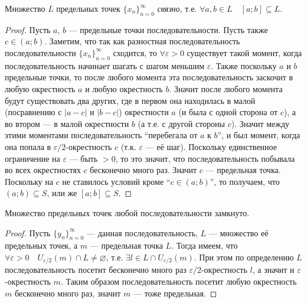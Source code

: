 \documentclass[12pt,a4paper]{article}
\begin{document}
    \begin{enumproblem}[\textcolor{green}{сдано}]
        \begin{lemma}
            Множество $L$ предельных точек $\{x_n\}_{n=0}^\infty$ \emph{связно}, т.е. $\forall a, b \in L \quad [a; b] \subseteq L$.
        \end{lemma}

        \begin{proof}
            Пусть $a$, $b$ --- предельные точки последовательности. Пусть также $c\in (a;b)$. Заметим, что так как разностная последовательность последовательности $\{x_n\}_{n=0}^\infty$ сходится, то $\forall \varepsilon > 0$ существует такой момент, когда последовательность начинает шагать с шагом меньшим $\varepsilon$. Также поскольку $a$ и $b$ предельные точки, то после любого момента эта последовательность заскочит в любую окрестность $a$ и любую окрестность $b$. Значит после любого момента будут существовать два других, где в первом она находилась в малой (посравнению с $|a-c|$ и $|b-c|$) окрестности $a$ (и была с одной сторона от $c$), а во втором --- в малой окрестности $b$ (а т.е. с другой стороны $c$). Значит между этими моментами последовательность ``перебегала от $a$ к $b$'', и был момент, когда она попала в $\varepsilon/2$-окрестность $c$ (т.к. $\varepsilon$ --- её шаг). Поскольку единственное ограничение на $\varepsilon$ --- быть $>0$, то это значит, что последовательность побывала во всех окрестностях $c$ бесконечно много раз. Значит $c$ --- предельная точка. Поскольку на $c$ не ставилось условий кроме ``$c\in (a;b)$'', то получаем, что $(a;b) \subseteq S$, или же $[a;b]\subseteq S$.
        \end{proof}

        \begin{lemma}
            Множество предельных точек любой последовательности замкнуто.
        \end{lemma}

        \begin{proof}
            Пусть $\{y_n\}_{n=0}^\infty$ --- данная последовательность, $L$ --- множество её предельных точек, а $m$ --- предельная точка $L$. Тогда имеем, что $\forall \varepsilon > 0\quad U_{\varepsilon/2}(m) \cap L \neq \varnothing$, т.е. $\exists l \in L \cap U_{\varepsilon/2}(m)$. При этом по определению $L$ последовательность посетит бесконечно много раз $\varepsilon/2$-окрестность $l$, а значит и $\varepsilon$-окрестность $m$. Таким образом последовательность посетит любую окрестность $m$ бесконечно много раз, значит $m$ --- тоже предельная.


\end{proof}
\end{enumproblem}
\end{document}
